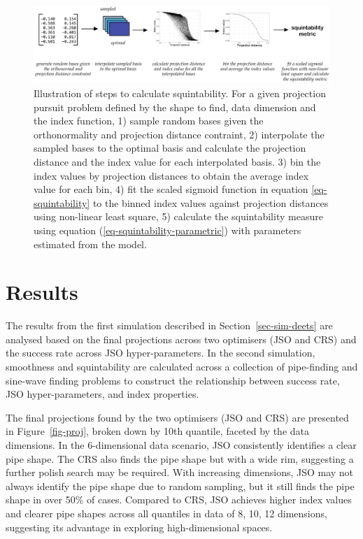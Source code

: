 \documentclass[
  12pt,
]{interact}
\theoremstyle{plain}
\begin{document}
\begin{figure}

{\centering \includegraphics[width=1\textwidth,height=\textheight]{figures/squintability.png}

}

\caption{\label{fig-squintability}Illustration of steps to calculate
squintability. For a given projection pursuit problem defined by the
shape to find, data dimension and the index function, 1) sample random
bases given the orthonormality and projection distance contraint, 2)
interpolate the sampled bases to the optimal basis and calculate the
projection distance and the index value for each interpolated basis. 3)
bin the index values by projection distances to obtain the average index
value for each bin, 4) fit the scaled sigmoid function in equation
\eqref{eq-squintability} to the binned index values against projection
distances using non-linear least square, 5) calculate the squintability
measure using equation (\ref{eq-squintability-parametric}) with
parameters estimated from the model.}

\end{figure}

\hypertarget{sec-sim-res}{%
\section{Results}\label{sec-sim-res}}

The results from the first simulation described in
Section~\ref{sec-sim-deets} are analysed based on the final projections
across two optimisers (JSO and CRS) and the success rate across JSO
hyper-parameters. In the second simulation, smoothness and squintability
are calculated across a collection of pipe-finding and sine-wave finding
problems to construct the relationship between success rate, JSO
hyper-parameters, and index properties.

The final projections found by the two optimisers (JSO and CRS) are
presented in Figure~\ref{fig-proj}, broken down by 10th quantile,
faceted by the data dimensions. In the 6-dimensional data scenario, JSO
consistently identifies a clear pipe shape. The CRS also finds the pipe
shape but with a wide rim, suggesting a further polish search may be
required. With increasing dimensions, JSO may not always identify the
pipe shape due to random sampling, but it still finds the pipe shape in
over 50\% of cases. Compared to CRS, JSO achieves higher index values
and clearer pipe shapes across all quantiles in data of 8, 10, 12
dimensions, suggesting its advantage in exploring high-dimensional
spaces.
\end{document}
